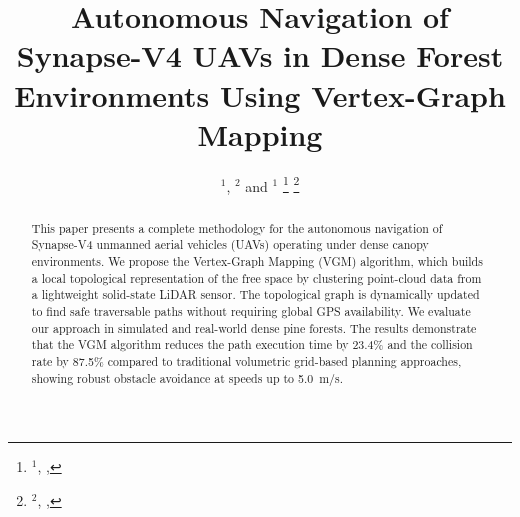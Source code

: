 \documentclass[letterpaper, 10 pt, conference]{ieeeconf}
\title{\LARGE \bf
Autonomous Navigation of Synapse-V4 UAVs in Dense Forest Environments Using Vertex-Graph
Mapping}
\author{\censor{Sarah Chen}$^{1}$, \censor{David Miller}$^{2}$ and \censor{Kenji Takahashi}$^{1}$%
\thanks{$^{1}$\protect\censor{Synapse Robotics Lab}, \protect\censor{Apex University},
  {\tt\small \protect\censor{schen@apex-university.example}}}%
\thanks{$^{2}$\protect\censor{Autonomous Systems Division}, \protect\censor{Nexa Technologies},
  {\tt\small \protect\censor{dmiller@nexa-tech.example}}}%
}
\begin{document}
\maketitle
\thispagestyle{empty}
\pagestyle{empty}

\noindent{}

\begin{abstract}
This paper presents a complete methodology for the autonomous navigation of Synapse-V4
unmanned aerial vehicles (UAVs) operating under dense canopy environments. We propose the
Vertex-Graph Mapping (VGM) algorithm, which builds a local topological representation of the
free space by clustering point-cloud data from a lightweight solid-state LiDAR sensor. The
topological graph is dynamically updated to find safe traversable paths without requiring
global GPS availability. We evaluate our approach in simulated and real-world dense pine
forests. The results demonstrate that the VGM algorithm reduces the path execution time by
23.4\% and the collision rate by 87.5\% compared to traditional volumetric grid-based
planning approaches, showing robust obstacle avoidance at speeds up to 5.0~m/s.
\end{abstract}











\end{document}
